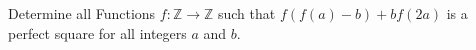 Determine all Functions $f:\mathbb{Z} \to \mathbb{Z}$ such that $f(f(a)-b)+bf(2a)$ is a perfect square for all integers $a$ and $b$.